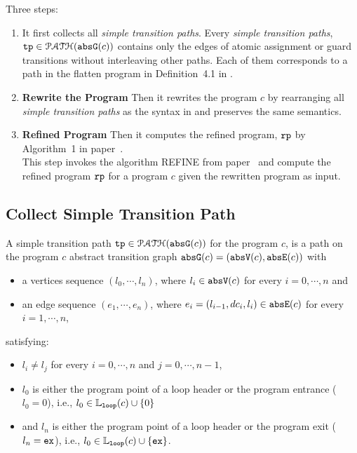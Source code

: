 Three steps:
\begin{enumerate}
  \item It first collects all \emph{simple transition paths}.
  Every \emph{simple transition paths}, $\mathtt{tp} \in \mathcal{PATH}(\mathtt{abs}{\mathtt{G}}(c))$ 
  contains only the edges of atomic assignment or guard transitions without interleaving other paths.
  Each of them corresponds to a path in the flatten program in Definition~4.1 in \cite{GulwaniJK09}.
%
    \item \textbf{Rewrite the Program}
    Then it rewrites the program $c$ by rearranging all \emph{simple transition paths} as the syntax in \cite{GulwaniJK09} and preserves the same semantics.
\item \textbf{Refined Program}
Then it computes the 
refined program, $\mathtt{rp}$ by Algorithm~1 in paper~\cite{GulwaniJK09}.
\\
This step invokes the algorithm REFINE from paper~\cite{GulwaniJK09} and compute the 
refined program $\mathtt{rp}$ for a program $c$ given the rewritten program as input.
\end{enumerate}

\subsection{Collect Simple Transition Path}
\begin{defn}
  \label{def:tpath}
A simple transition path
$\mathtt{tp} \in \mathcal{PATH}(\mathtt{abs}{\mathtt{G}}(c))$ for the program $c$, is a path on the program $c$ abstract transition graph $\mathtt{abs}{\mathtt{G}}(c) = (\mathtt{abs}{\mathtt{V}}(c), \mathtt{abs}{\mathtt{E}}(c))$ with 
\begin{itemize}
\item a vertices sequence $(l_0, \cdots, l_n)$, where $l_i \in \mathtt{abs}{\mathtt{V}}(c)$ for every $i = 0, \cdots, n$ and
%
\item an edge sequence $(e_1, \cdots, e_n)$, where $e_i = (l_{i - 1}, dc_i, l_{i}) \in \mathtt{abs}{\mathtt{E}}(c)$ for every $i = 1, \cdots, n$,
\end{itemize}
%
satisfying:
\begin{itemize}
  \item $l_i \neq l_j$ for every $i = 0, \cdots, n$ and $j = 0, \cdots, {n - 1}$,
  \item $l_0$ is either the program point of a loop header or the program entrance ($l_0 = 0$),
  i.e., $l_0 \in \mathbb{L}_{\mathtt{loop}}(c) \cup \{ 0 \}$
  \item and $l_n$ is either the program point of a loop header or the program exit ($l_n = \mathtt{ex}$),
  i.e., $l_0 \in \mathbb{L}_{\mathtt{loop}}(c) \cup \{ \mathtt{ex} \}$.
\end{itemize}
\end{defn}

